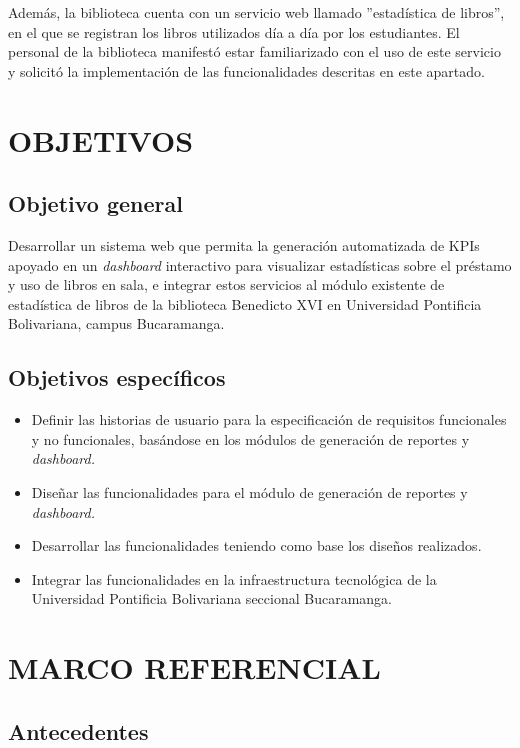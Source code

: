 \documentclass[spanish]{ieee_upb}
\begin{document}
Además, la biblioteca cuenta con un servicio web llamado ''estadística de libros'', en el que se registran los libros utilizados día a día por los estudiantes. El personal de la biblioteca manifestó estar familiarizado con el uso de este servicio y solicitó la implementación de las funcionalidades descritas en este apartado.

\newpage
\section{OBJETIVOS}

\subsection{Objetivo general}

Desarrollar un sistema web que permita la generación automatizada de KPIs apoyado en un \textit{dashboard} interactivo para visualizar estadísticas sobre el préstamo y uso de libros en sala, e integrar estos servicios al módulo existente de estadística de libros de la biblioteca Benedicto XVI en Universidad Pontificia Bolivariana, campus Bucaramanga.

\subsection{Objetivos específicos}

\begin{itemize}
\item Definir  las historias de usuario para la especificación de requisitos funcionales y no funcionales, basándose en los módulos de generación de reportes y \textit{dashboard.}
\item Diseñar las funcionalidades para el módulo de generación de reportes y \textit{dashboard.}
\item Desarrollar las funcionalidades teniendo como base los diseños realizados.
\item Integrar las funcionalidades en la infraestructura tecnológica de la Universidad Pontificia Bolivariana seccional Bucaramanga.
\end{itemize}


\newpage
\section{MARCO REFERENCIAL}

\subsection{Antecedentes}
\end{document}
